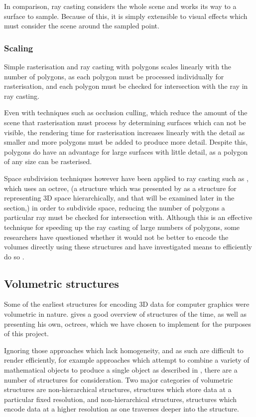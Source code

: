 In comparison, ray casting considers the whole scene and works its way to a surface to sample. Because of this, it is simply extensible to visual effects which must consider the scene around the sampled point.

\subsubsection{Scaling}
Simple rasterisation and ray casting with polygons scales linearly with the number of polygons, as each polygon must be processed individually for rasterisation, and each polygon must be checked for intersection with the ray in ray casting.

Even with techniques such as occlusion culling, which reduce the amount of the scene that rasterisation must process by determining surfaces which can not be visible, the rendering time for rasterisation increases linearly with the detail as smaller and more polygons must be added to produce more detail. Despite this, polygons do have an advantage for large surfaces with little detail, as a polygon of any size can be rasterised.

Space subdivision techniques however have been applied to ray casting such as \cite{glassner84space}, which uses an octree, (a structure which was presented by \cite{meagher80octree} as a structure for representing 3D space hierarchically, and that will be examined later in the section,) in order to subdivide space, reducing the number of polygons a particular ray must be checked for intersection with. Although this is an effective technique for speeding up the ray casting of large numbers of polygons, some researchers have questioned whether it would not be better to encode the volumes directly using these structures and have investigated means to efficiently do so \parencite{laine10efficientsvos}.

\subsection{Volumetric structures}
Some of the earliest structures for encoding 3D data for computer graphics were volumetric in nature. \cite{meagher81octree} gives a good overview of structures of the time, as well as presenting his own, octrees, which we have chosen to implement for the purposes of this project.

Ignoring those approaches which lack homogeneity, and as such are difficult to render efficiently, for example approaches which attempt to combine a variety of mathematical objects to produce a single object as described in \cite{meagher81octree}, there are a number of structures for consideration. Two major categories of volumetric structures are non-hierarchical structures, structures which store data at a particular fixed resolution, and non-hierarchical structures, structures which encode data at a higher resolution as one traverses deeper into the structure.

